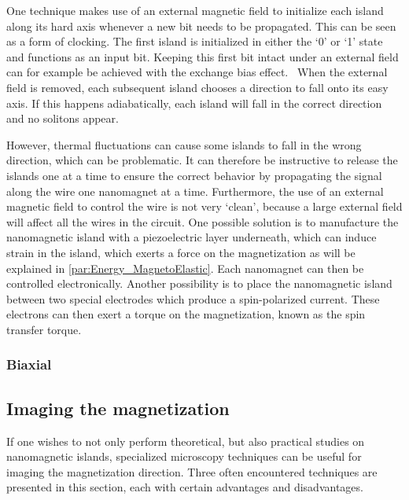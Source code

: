 \documentclass[10pt,a4paper]{article}
\begin{document}
One technique makes use of an external magnetic field to initialize each island along its hard axis whenever a new bit needs to be propagated. This can be seen as a form of clocking. The first island is initialized in either the `0' or `1' state and functions as an input bit. Keeping this first bit intact under an external field can for example be achieved with the exchange bias effect.~\cite{ExchangeBias_Mechanisms,ExchangeBias_Mechanisms,ExchangeBias} When the external field is removed, each subsequent island chooses a direction to fall onto its easy axis. If this happens adiabatically, each island will fall in the correct direction and no solitons appear.~\cite{NML_Carlton} \par
However, thermal fluctuations can cause some islands to fall in the wrong direction, which can be problematic. It can therefore be instructive to release the islands one at a time to ensure the correct behavior by propagating the signal along the wire one nanomagnet at a time. Furthermore, the use of an external magnetic field to control the wire is not very `clean', because a large external field will affect all the wires in the circuit. One possible solution is to manufacture the nanomagnetic island with a piezoelectric layer underneath, which can induce strain in the island, which exerts a force on the magnetization as will be explained in \cref{par:Energy_MagnetoElastic}. Each nanomagnet can then be controlled electronically. Another possibility is to place the nanomagnetic island between two special electrodes which produce a spin-polarized current. These electrons can then exert a torque on the magnetization, known as the spin transfer torque.~\cite{SwitchingForced_EnergyEfficient,syllabus_PoAEaPD}

\subsubsection{Biaxial}

\subsection{Imaging the magnetization}
If one wishes to not only perform theoretical, but also practical studies on nanomagnetic islands, specialized microscopy techniques can be useful for imaging the magnetization direction. Three often encountered techniques are presented in this section, each with certain advantages and disadvantages.
\end{document}
